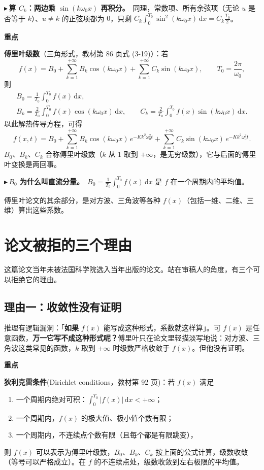 \documentclass[UTF8,a4paper,11pt]{ctexart}
\newenvironment{remember}{\begin{rememberbox}\textbf{重点}\par\smallskip}{\end{rememberbox}}
\newcounter{ex}[section]
\newcommand{\point}[1]{\par\addvspace{1ex}\noindent\textcolor{ptteal}{$\blacktriangleright$\,\textbf{#1}}\ }
\begin{document}
\point{算 $C_k$：两边乘 $\sin(k\omega_0x)$ 再积分。}同理，常数项、所有余弦项（无论 $u$ 是否等于 $k$）、$u\ne k$ 的正弦项都为 $0$，只剩 $C_k\int_0^{T_0}\sin^2(k\omega_0x)\,\mathrm{d}x=C_k\frac{T_0}{2}$。

\begin{remember}
\textbf{傅里叶级数}（三角形式，教材第 86 页式 (3-19)）：若
\[
f(x)=B_0+\sum_{k=1}^{+\infty}B_k\cos(k\omega_0x)+\sum_{k=1}^{+\infty}C_k\sin(k\omega_0x),\qquad T_0=\frac{2\pi}{\omega_0},
\]
则
\begin{gather*}
B_0=\frac{1}{T_0}\int_0^{T_0}f(x)\,\mathrm{d}x,\\
B_k=\frac{2}{T_0}\int_0^{T_0}f(x)\cos(k\omega_0x)\,\mathrm{d}x,\qquad
C_k=\frac{2}{T_0}\int_0^{T_0}f(x)\sin(k\omega_0x)\,\mathrm{d}x .
\end{gather*}
以此解热传导方程，可得
\[
f(x,t)=B_0+\sum_{k=1}^{+\infty}B_k\cos(k\omega_0x)\,e^{-Kk^2\omega_0^2t}+\sum_{k=1}^{+\infty}C_k\sin(k\omega_0x)\,e^{-Kk^2\omega_0^2t}.
\]
$B_0$、$B_k$、$C_k$ 合称傅里叶级数（$k$ 从 $1$ 取到 $+\infty$，是无穷级数），它与后面的傅里叶变换是两回事。
\end{remember}

\point{$B_0$ 为什么叫直流分量。}$B_0=\frac{1}{T_0}\int_0^{T_0}f(x)\,\mathrm{d}x$ 是 $f$ 在一个周期内的平均值。

傅里叶论文的其余部分，是对方波、三角波等各种 $f(x)$（包括一维、二维、三维）算出这些系数。

\section{论文被拒的三个理由}\label{sec:reject}
这篇论文当年未被法国科学院选入当年出版的论文。站在审稿人的角度，有三个可以拒绝它的理由。

\subsection{理由一：收敛性没有证明}
推理有逻辑漏洞：「\textbf{如果} $f(x)$ 能写成这种形式，系数就这样算」。可 $f(x)$ 是任意函数，\textbf{万一它写不成这种形式呢？}傅里叶只在论文里轻描淡写地说：对方波、三角波这类常见的函数，$k$ 取到 $+\infty$ 时级数严格收敛于 $f(x)$。但他没有证明。

\begin{remember}
\textbf{狄利克雷条件}(Dirichlet conditions，教材第 92 页)：若 $f(x)$ 满足
\begin{enumerate}[nosep]
\item 一个周期内绝对可积：$\displaystyle\int_0^{T_0}|f(x)|\,\mathrm{d}x<+\infty$；
\item 一个周期内，$f(x)$ 的极大值、极小值个数有限；
\item 一个周期内，不连续点个数有限（且每个都是有限跳变），
\end{enumerate}
则 $f(x)$ 可以表示为傅里叶级数，$B_0$、$B_k$、$C_k$ 按上面的公式计算，级数收敛（等号可以严格成立）。在 $f$ 的不连续点处，级数收敛到左右极限的平均值。
\end{remember}
\end{document}

